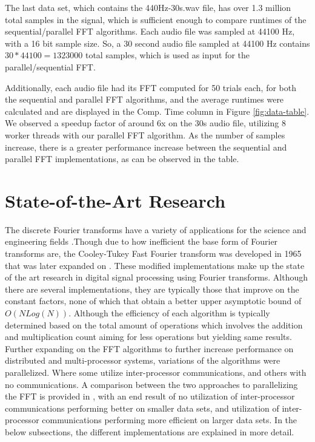 \documentclass[journal]{IEEEtran}
\begin{document}
	\vspace{1em}
	\par{
		The last data set, which contains the 440Hz-30s.wav file, has over
		1.3 million total samples in the signal, which is sufficient enough
		to compare runtimes of the sequential/parallel FFT algorithms. Each
		audio file was sampled at 44100 Hz, with a 16 bit sample size. So, a 30
		second audio file sampled at 44100 Hz contains $30 * 44100 = 1323000$
		total samples, which is used as input for the parallel/sequential FFT.
	}
	\par{
		Additionally, each audio file had its FFT computed for 50 trials each, 
		for both the sequential and parallel FFT algorithms, and the 
		average runtimes were calculated and are displayed in the Comp. Time 
		column in Figure \ref{fig:data-table}. We observed a speedup factor of 
		around 6x on the 30s audio file, utilizing 8 worker threads with our 
		parallel FFT algorithm. As the number of samples increase, 
		there is a greater performance increase between the sequential and 
		parallel FFT implementations, as can be observed in the table.
	}

\section{State-of-the-Art Research}


	\par {
		The discrete Fourier transforms have a variety of applications for the 
		science and engineering fields \cite{Xiang}.Though due to how inefficient 
		the base form of Fourier transforms are, the Cooley-Tukey Fast Fourier transform 
		was developed in 1965 that was later expanded on \cite{CTA}. These modified implementations 
		make up the state of the art research in digital signal processing using Fourier transforms. 
		Although there are several implementations, they are typically those that improve on the constant 
		factors, none of which that obtain a better upper asymptotic bound of ${O(N Log(N))}$. Although 
		the efficiency of each algorithm is typically determined based on the total amount of operations which 
		involves the addition and multiplication count aiming for less operations but yielding same results. 
		Further expanding on the FFT algorithms to further increase performance on distributed and multi-processor systems, variations of the algorithms 
		were parallelized. Where some utilize inter-processor communications, and others with no communications. 
		A comparison between the two approaches to parallelizing the FFT is provided in \cite{Pan}, with an 
		end result of no utilization of inter-processor communications performing better on smaller data sets, and utilization of inter-processor communications 
		performing more efficient on larger data sets. In the below subsections, the different implementations 
		are explained in more detail.
	}
\end{document}
